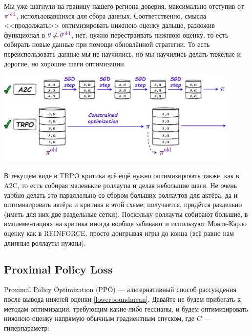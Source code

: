 Мы уже шагнули на границу нашего региона доверия, максимально отступив от $\textcolor{ChadPurple}{\pi^{\old}}$, использовавшихся для сбора данных. Соответственно, смысла <<продолжать>> оптимизировать нижнюю оценку дальше, разложив функционал в $\textcolor{ChadBlue}{\theta} \ne \textcolor{ChadPurple}{\theta^{\old}}$, нет; нужно перестраивать нижнюю оценку, то есть собирать новые данные при помощи обновлённой стратегии. То есть переиспользовать данные мы не научились, но мы научились делать тяжёлые и дорогие, но хорошие шаги оптимизации. 

\vspace{0.4cm}
\begin{center}
\includegraphics[width=0.9\textwidth]{Images/TRPOpipeline2.png}
\end{center}

\begin{remark}
В текущем виде в TRPO критика всё ещё нужно оптимизировать также, как в A2C, то есть собирая маленькие роллауты и делая небольшие шаги. Не очень удобно делать это параллельно со сбором больших роллаутов для актёра, да и оптимизировать актёра и критика в этой схеме, получается, придётся раздельно (иметь для них две раздельные сетки). Поскольку роллауты собирают большие, в имплементациях на критика иногда вообще забивают и используют Монте-Карло оценку как в REINFORCE, просто доигрывая игры до конца (всё равно нам длинные роллауты нужны).
\end{remark}

\subsection{Proximal Policy Loss}

Proximal Policy Optimization (PPO) --- альтернативный способ рассуждения после вывода нижней оценки \eqref{lowerboundmean}. Давайте не будем прибегать к методам оптимизации, требующим какие-либо гессианы, и будем оптимизировать нижнюю оценку напрямую обычным градиентным спуском, где $C$ --- гиперпараметр:

